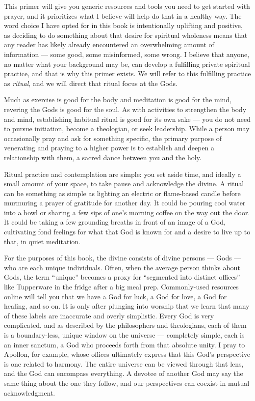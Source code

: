 \documentclass[
]{book}
\begin{document}
This primer will give you generic resources and tools you need to get started with prayer, and it prioritizes what I believe will help do that in a healthy way. The word choice I have opted for in this book is intentionally uplifting and positive, as deciding to do something about that desire for spiritual wholeness means that any reader has likely already encountered an overwhelming amount of information --- some good, some misinformed, some wrong. I believe that anyone, no matter what your background may be, can develop a fulfilling private spiritual practice, and that is why this primer exists. We will refer to this fulfilling practice as \emph{ritual}, and we will direct that ritual focus at the Gods.

Much as exercise is good for the body and meditation is good for the mind, revering the Gods is good for the soul. As with activities to strengthen the body and mind, establishing habitual ritual is good for its own sake --- you do not need to pursue initiation, become a theologian, or seek leadership. While a person may occasionally pray and ask for something specific, the primary purpose of venerating and praying to a higher power is to establish and deepen a relationship with them, a sacred dance between you and the holy.

Ritual practice and contemplation are simple: you set aside time, and ideally a small amount of your space, to take pause and acknowledge the divine. A ritual can be something as simple as lighting an electric or flame-based candle before murmuring a prayer of gratitude for another day. It could be pouring cool water into a bowl or sharing a few sips of one's morning coffee on the way out the door. It could be taking a few grounding breaths in front of an image of a God, cultivating fond feelings for what that God is known for and a desire to live up to that, in quiet meditation.

For the purposes of this book, the divine consists of divine persons --- Gods --- who are each unique individuals. Often, when the average person thinks about Gods, the term ``unique'' becomes a proxy for ``segmented into distinct offices'' like Tupperware in the fridge after a big meal prep. Commonly-used resources online will tell you that we have a God for luck, a God for love, a God for healing, and so on. It is only after plunging into worship that we learn that many of these labels are inaccurate and overly simplistic. Every God is very complicated, and as described by the philosophers and theologians, each of them is a boundary-less, unique window on the universe --- completely simple, each is an inner sanctum, a God who proceeds forth from that absolute unity. I pray to Apollon, for example, whose offices ultimately express that this God's perspective is one related to harmony. The entire universe can be viewed through that lens, and the God can encompass everything. A devotee of another God may say the same thing about the one they follow, and our perspectives can coexist in mutual acknowledgment.
\end{document}
